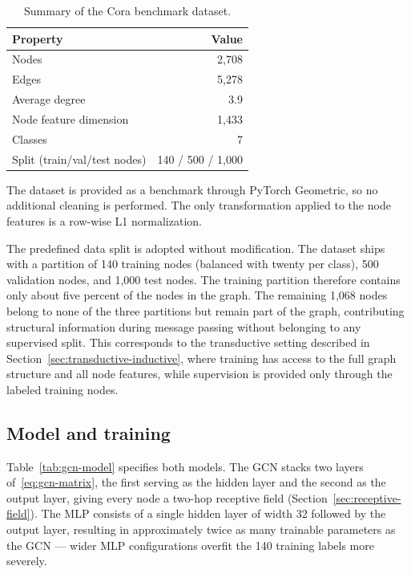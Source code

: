 \begin{table}
  \caption[Cora dataset.]{%
    Summary of the Cora benchmark dataset.
  }
  \label{tab:cora-stats}
  \begin{center}
    \small
    \begin{tabular}{lr}
      \toprule
      Property & Value \\
      \midrule
      Nodes                        & 2{,}708 \\
      Edges                        & 5{,}278 \\
      Average degree               & 3.9 \\
      Node feature dimension       & 1{,}433 \\
      Classes                      & 7 \\
      Split (train/val/test nodes) & 140 / 500 / 1{,}000 \\
      \bottomrule
    \end{tabular}
  \end{center}
\end{table}

The dataset is provided as a benchmark through PyTorch Geometric, so no
additional cleaning is performed. The only transformation applied to the node
features is a row-wise L1 normalization.

The predefined data split is adopted without modification. The dataset ships with
a partition of 140 training nodes (balanced with twenty per class), 500 validation nodes,
and 1{,}000 test nodes. The training partition therefore contains only about five percent
of the nodes in the graph. The remaining 1{,}068 nodes belong to none of the three
partitions but remain part of the graph, contributing structural information during
message passing without belonging to any supervised split.
This corresponds to the transductive setting described in
Section~\ref{sec:transductive-inductive}, where training has access to the
full graph structure and all node features, while supervision is provided
only through the labeled training nodes.

\subsection{Model and training}
\label{sec:gcn-training}

Table~\ref{tab:gcn-model} specifies both models. The GCN stacks two
layers of~\eqref{eq:gcn-matrix}, the first serving as the hidden layer and the second
as the output layer, giving every node a two-hop receptive field
(Section~\ref{sec:receptive-field}). The MLP consists of a single hidden layer of
width 32 followed by the output layer, resulting in approximately twice as many
trainable parameters as the GCN --- wider MLP configurations
overfit the 140 training labels more severely.


